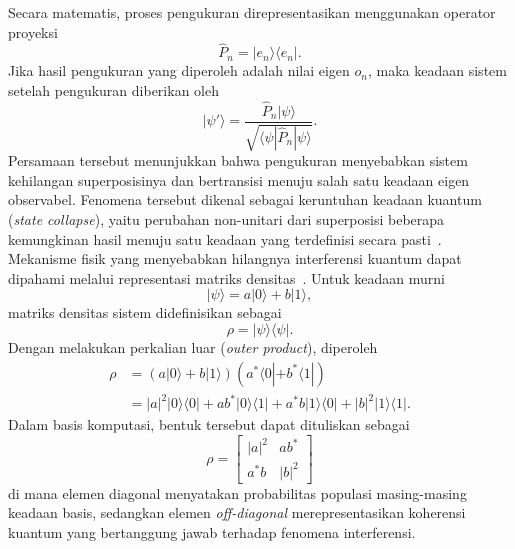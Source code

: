 Secara matematis, proses pengukuran direpresentasikan menggunakan operator proyeksi
\begin{equation} \hat{P}_n = |e_n\rangle\langle e_n|.
\end{equation}
Jika hasil pengukuran yang diperoleh adalah nilai eigen $o_n$, maka keadaan sistem setelah pengukuran diberikan oleh
\begin{equation}
|\psi'\rangle = \frac{\hat{P}_n|\psi\rangle} {\sqrt{\langle\psi|\hat{P}_n|\psi\rangle}}.
\end{equation}
Persamaan tersebut menunjukkan bahwa pengukuran menyebabkan sistem kehilangan superposisinya dan bertransisi menuju salah satu keadaan eigen observabel. Fenomena tersebut dikenal sebagai keruntuhan keadaan kuantum (\textit{state collapse}), yaitu perubahan non-unitari dari superposisi beberapa kemungkinan hasil menuju satu keadaan yang terdefinisi secara pasti~. Mekanisme fisik yang menyebabkan hilangnya interferensi kuantum dapat dipahami melalui representasi matriks densitas~\cite{revythi_quantum_2025}. Untuk keadaan murni
\begin{equation}
|\psi\rangle = a|0\rangle+b|1\rangle,
\end{equation}
matriks densitas sistem didefinisikan sebagai
\begin{equation}
\rho = |\psi\rangle\langle\psi|.
\end{equation}
Dengan melakukan perkalian luar (\textit{outer product}), diperoleh
\begin{equation}
\begin{split}
\rho &= (a|0\rangle+b|1\rangle) (a^*\langle0|+b^*\langle1|)\\
&= |a|^2|0\rangle\langle0|+ ab^*|0\rangle\langle1| + a^*b|1\rangle\langle0| + |b|^2|1\rangle\langle1|.
\end{split}
\end{equation}
Dalam basis komputasi, bentuk tersebut dapat dituliskan sebagai
\begin{equation}
\rho=
\begin{bmatrix}
|a|^2 & ab^*\\
a^*b & |b|^2
\end{bmatrix}
\end{equation}
di mana elemen diagonal menyatakan probabilitas populasi masing-masing keadaan basis, sedangkan elemen \textit{off-diagonal} merepresentasikan koherensi kuantum yang bertanggung jawab terhadap fenomena interferensi.

